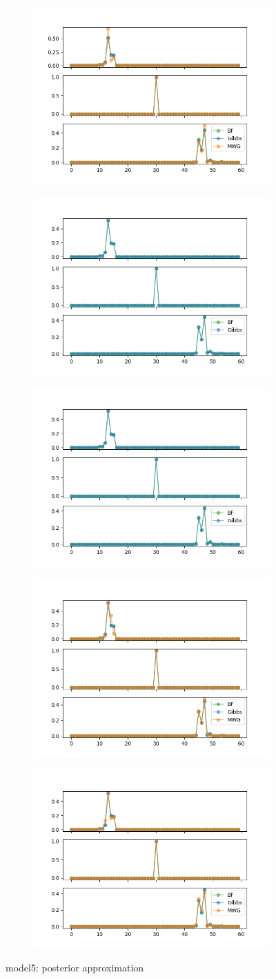 \begin{figure}[H]
    \centering
    \begin{subfigure}
    	\centering
        \includegraphics[width=0.3\linewidth]{../../plots/Posterior_post_burnin_M4_N60_NMCMC3_seed0_diffind2.png}
    \end{subfigure}
    \begin{subfigure}
        \centering
    	\includegraphics[width=0.3\linewidth]{../../plots/Posterior_post_burnin_M4_N60_NMCMC3_seed1_diffind2.png}
	\end{subfigure}
	\begin{subfigure}
	    \centering
    	\includegraphics[width=0.3\linewidth]{../../plots/Posterior_post_burnin_M4_N60_NMCMC3_seed2_diffind2.png}
	\end{subfigure}
	\begin{subfigure}
	    \centering
    	\includegraphics[width=0.3\linewidth]{../../plots/Posterior_post_burnin_M4_N60_NMCMC3_seed3_diffind2.png}
	\end{subfigure}
	\begin{subfigure}
	    \centering
    	\includegraphics[width=0.3\linewidth]{../../plots/Posterior_post_burnin_M4_N60_NMCMC3_seed4_diffind2.png}
	\end{subfigure}
	\caption{model5: posterior approximation}
\end{figure}

